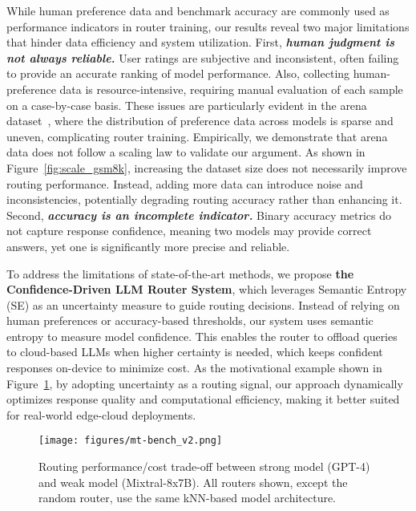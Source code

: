 While human preference data and benchmark accuracy are commonly used as performance indicators in router training, our results reveal two major limitations that hinder data efficiency and system utilization. First, \textbf{\textit{human judgment is not always reliable.}} User ratings are subjective and inconsistent, often failing to provide an accurate ranking of model performance. Also, collecting human-preference data is resource-intensive, requiring manual evaluation of each sample on a case-by-case basis. These issues are particularly evident in the arena dataset~\cite{chiang2024chatbot}, where the distribution of preference data across models is sparse and uneven, complicating router training. Empirically, we demonstrate that arena data does not follow a scaling law to validate our argument. As shown in Figure~\ref{fig:scale_gsm8k}, increasing the dataset size does not necessarily improve routing performance. Instead, adding more data can introduce noise and inconsistencies, potentially degrading routing accuracy rather than enhancing it. Second, \textbf{\textit{accuracy is an incomplete indicator.}} Binary accuracy metrics do not capture response confidence, meaning two models may provide correct answers, yet one is significantly more precise and reliable.

To address the limitations of state-of-the-art methods, we propose \textbf{the Confidence-Driven LLM Router System}, which leverages Semantic Entropy (SE) as an uncertainty measure to guide routing decisions. Instead of relying on human preferences or accuracy-based thresholds, our system uses semantic entropy to measure model confidence. This enables the router to offload queries to cloud-based LLMs when higher certainty is needed, which keeps confident responses on-device to minimize cost. As the motivational example shown in Figure~\ref{fig:mt_bench}, by adopting uncertainty as a routing signal, our approach dynamically optimizes response quality and computational efficiency, making it better suited for real-world edge-cloud deployments.

\begin{figure}[t]
  \begin{center}
    \texttt{[image: figures/mt-bench\_v2.png]}
  \end{center}
  \vspace{-5mm}
  \caption{Routing performance/cost trade-off between strong model (GPT-4) and weak model (Mixtral-8x7B). All routers shown, except the random router, use the same kNN-based model architecture.}
  \label{fig:mt_bench}
  \vspace{-4mm}
\end{figure}
